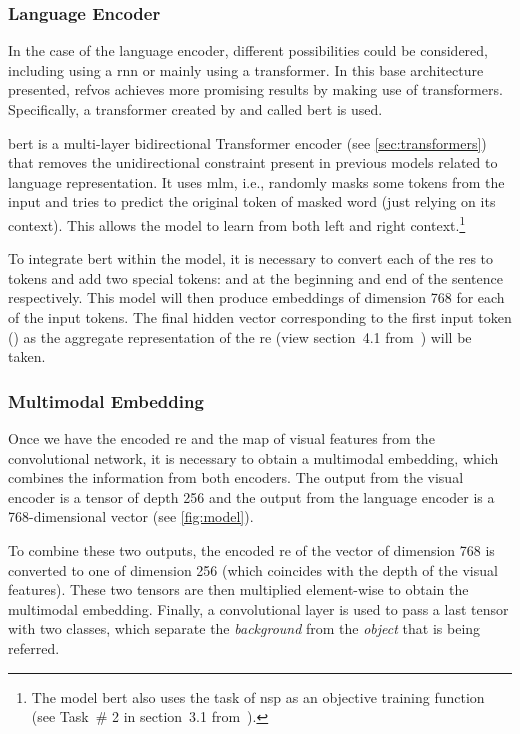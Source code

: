 \subsubsection{Language Encoder}

In the case of the language encoder, different possibilities could be
considered, including using a \gls{rnn} or mainly using a transformer. In this
base architecture presented, \gls{refvos} achieves more promising results by
making use of transformers. Specifically, a transformer created by
 and called \gls{bert} is used.

\gls{bert} is a multi-layer bidirectional Transformer encoder (see
\vref{sec:transformers}) that removes the unidirectional constraint present in
previous models related to language representation. It uses \gls{mlm}, i.e.,
randomly masks some tokens from the input and tries to predict the original
token of masked word (just relying on its context). This allows the model to
learn from both left and right context.\footnote{The model \gls{bert} also uses
  the task of \gls{nsp} as an objective training function (see Task~\# 2 in
  section~3.1 from~\cite{devlin19:bert}).}

To integrate \gls{bert} within the model, it is necessary to convert each of
the \glspl{re} to tokens and add two special tokens: \code{[CLS]} and
\code{[SEP]} at the beginning and end of the sentence respectively. This model
will then produce embeddings of dimension 768 for each of the input tokens. The
final hidden vector corresponding to the first input token (\code{[CLS]}) as
the aggregate representation of the \gls{re} (view section~4.1
from~\cite{devlin19:bert}) will be taken.

\subsubsection{Multimodal Embedding}

Once we have the encoded \gls{re} and the map of visual features from the
convolutional network, it is necessary to obtain a multimodal embedding, which
combines the information from both encoders. The output from the visual encoder
is a tensor of depth 256 and the output from the language encoder is a
768-dimensional vector (see \vref{fig:model}).

To combine these two outputs, the encoded \gls{re} of the vector of dimension
768 is converted to one of dimension 256 (which coincides with the depth of the
visual features). These two tensors are then multiplied element-wise to obtain
the multimodal embedding. Finally, a convolutional layer is used to pass a last
tensor with two classes, which separate the \emph{background} from the
\emph{object} that is being referred.


